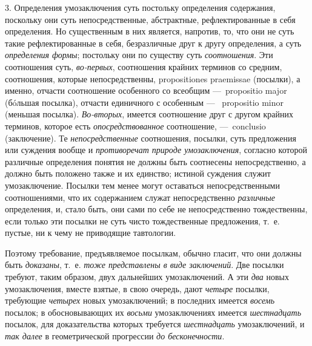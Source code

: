 \documentclass[twoside]{article}
\begin{document}
{{{3. Определения умозаключения суть постольку определения
содержания, поскольку они суть непосредственные, абстрактные,
рефлектированные в себя определения. Но существенным в них является,
напротив, то, что они не суть такие рефлектированные в себя, безразличные
друг к другу определения, а суть
{\em определения формы};
постольку они по существу суть
{\em соотношения}. Эти
соотношения суть, {\em во-первых},
соотношения крайних терминов со средним, соотношения, которые
непосредственны, propositiones praemissae (посылки), а
именно, отчасти соотношение особенного со всеобщим —~propositio major
(бóльшая посылка), отчасти единичного с особенным —~
propositio minor (меньшая посылка).
{\em Во-вторых}, имеется
соотношение друг с другом крайних терминов, которое есть
{\em опосредствованное}
соотношение,  —~conclusio (заключение). Те
{\em непосредственные}
соотношения, посылки, суть предложения или суждения вообще и
{\em противоречат природе
умозаключения}, согласно которой различные определения
понятия не должны быть соотнесены непосредственно, а должно быть положено
также и их единство; истиной суждения служит умозаключение. Посылки тем
менее могут оставаться непосредственными соотношениями, что их содержанием
служат непосредственно {\em различные}
определения, и, стало быть, они сами по себе не
непосредственно тождественны, если только эти посылки не суть чисто
тождественные предложения, т.~е. пустые, ни к чему не приводящие
тавтологии.

Поэтому требование, предъявляемое посылкам, обычно гласит, что
они должны быть {\em доказаны},
т.~е. {\em тоже
представлены в виде заключений}. Две посылки требуют, таким
образом, двух дальнейших умозаключений. А эти
{\em два} новых
умозаключения, вместе взятые, в свою очередь, дают
{\em четыре} посылки,
требующие {\em четырех}
новых умозаключений; в последних имеется
{\em восемь} посылок; в
обосновывающих их {\em восьми}
умозаключениях имеется
{\em шестнадцать}
посылок, для доказательства которых требуется
{\em шестнадцать}
умозаключений, и {\em так
далее} в геометрической прогрессии
{\em до бесконечности}.

}}}
\end{document}
